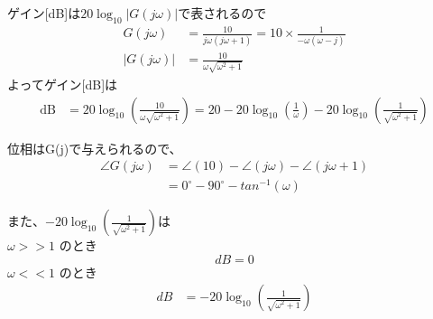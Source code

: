 \documentclass[a4paper,12pt]{article}
\begin{document}
\begin{tcolorbox}[title={7. \(G(s)=\dfrac{10}{s(s+1)}\)について、周波数応答関数、ゲイン(dB)、位相(deg.)を求めよ。
また、漸近線を用いてボード線図の概形を描け。各軸には適宜数値を記入し、折れ点等の特徴点を明示すること。}]

ゲイン[dB]は\(20\log_{10} \left| G(j\omega) \right|\)で表されるので\\
\vspace{-6mm}
\begin{align*}
    G(j\omega) &= \frac{10}{j\omega(j\omega + 1)} = 10 \times \frac{1}{-\omega(\omega - j)} \\
    \left| G(j\omega) \right| &= \frac{10}{\omega \sqrt{\omega^2 + 1}}
\end{align*}
よってゲイン[dB]は\\
\vspace{-6mm}
\begin{align*}
\mathrm{dB} &= 20 \log_{10} \left( \frac{10}{\omega \sqrt{\omega^2 + 1}} \right)
=20 -20 \log_{10} \left( \frac{1}{\omega} \right) - 20 \log_{10} \left( \frac{1}{ \sqrt{\omega^2 + 1}} \right)
\end{align*}

位相は\angle G(j\omega)で与えられるので、
\begin{align*}
\angle G(j\omega) &= \angle (10) - \angle (j\omega) - \angle (j\omega + 1)\\
                &= 0^\circ - 90^\circ- tan^{-1}(\omega)
\end{align*}



\begin{minipage}{0.45\linewidth}
\vspace{-24mm}
また、\(- 20 \log_{10} \left( \frac{1}{ \sqrt{\omega^2 + 1}} \right)\)は\\
\(\omega >> 1\) のとき
\[
dB = 0
\]
\(\omega << 1\) のとき
\begin{align*}
    dB &= - 20 \log_{10} \left( \frac{1}{ \sqrt{\omega^2 + 1}} \right)
\end{align*}
\end{minipage}
\hfill
\begin{minipage}{0.5\linewidth}
\begin{center}
\end{center}
\end{minipage}
\end{tcolorbox}
\end{document}
